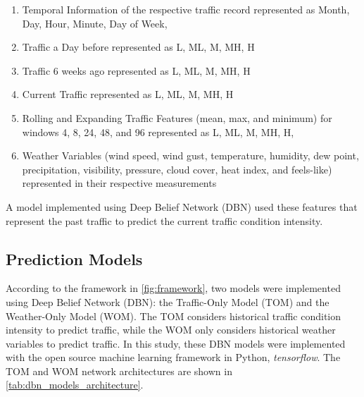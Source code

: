\begin{enumerate}
\item Temporal Information of the respective traffic record represented as Month, Day, Hour, Minute, Day of Week,
\item Traffic a Day before represented as L, ML, M, MH, H
\item Traffic 6 weeks ago represented as L, ML, M, MH, H
\item Current Traffic represented as L, ML, M, MH, H
\item Rolling and Expanding Traffic Features (mean, max, and minimum) for windows 4, 8, 24, 48, and 96 represented as L, ML, M, MH, H,
\item Weather Variables (wind speed, wind gust, temperature, humidity, dew point, precipitation, visibility, pressure, cloud cover, heat index, and feels-like) represented in their respective measurements
\end{enumerate}

A model implemented using Deep Belief Network (DBN) used these features that represent the past traffic to predict the current traffic condition intensity.

\subsection{Prediction Models}
According to the framework in \ref{fig:framework}, two models were implemented using Deep Belief Network (DBN): the Traffic-Only Model (TOM) and the Weather-Only Model (WOM). The TOM considers historical traffic condition intensity to predict traffic, while the WOM only considers historical weather variables to predict traffic. In this study, these DBN models were implemented with the open source machine learning framework in Python, \textit{tensorflow}. The TOM and WOM network architectures are shown in \ref{tab:dbn_models_architecture}. 

